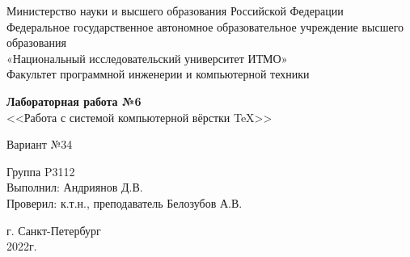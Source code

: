 


% 
\begin{center}


    \large Министерство науки и высшего образования Российской Федерации \\ Федеральное государственное автономное образовательное учреждение высшего образования \\«Национальный исследовательский университет ИТМО» \\Факультет программной инженерии и компьютерной техники\\
    
    \vspace{3cm}
    
    \Large\textbf{Лабораторная работа №6}\\<<Работа с системой компьютерной вёрстки \TeX>>
    
    \Large Вариант №34
    
\end{center}

\vspace{5cm}

\begin{flushright}
    Группа P3112\\
    Выполнил: Андриянов Д.В.\\
    Проверил: к.т.н., преподаватель Белозубов А.В.
\end{flushright}

\vspace{5cm}

\begin{center}
    г. Санкт-Петербург\\
    2022г.
\end{center}
    
% 